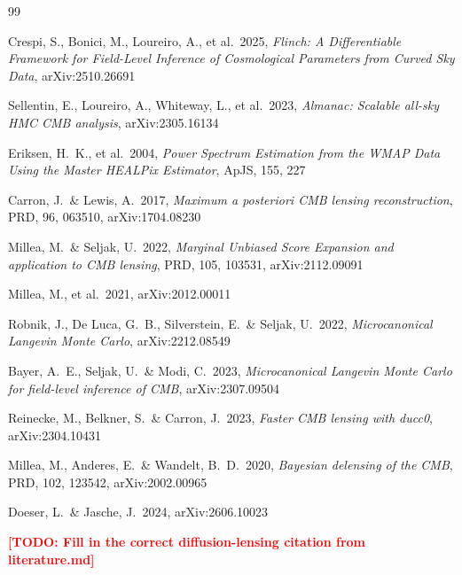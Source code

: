 \documentclass[twocolumn,superscriptaddress,aps,prl,floatfix]{revtex4-2}
\newcommand{\todo}[1]{\textcolor{red}{\textbf{[TODO: #1]}}}
\begin{document}
\begin{thebibliography}{99}

Crespi, S., Bonici, M., Loureiro, A., et al.\ 2025,
\textit{Flinch: A Differentiable Framework for Field-Level Inference of Cosmological Parameters from Curved Sky Data},
arXiv:2510.26691

Sellentin, E., Loureiro, A., Whiteway, L., et al.\ 2023,
\textit{Almanac: Scalable all-sky HMC CMB analysis},
arXiv:2305.16134

Eriksen, H.\ K., et al.\ 2004,
\textit{Power Spectrum Estimation from the WMAP Data Using the Master HEALPix Estimator},
ApJS, 155, 227

Carron, J.\ \& Lewis, A.\ 2017,
\textit{Maximum a posteriori CMB lensing reconstruction},
PRD, 96, 063510,
arXiv:1704.08230

Millea, M.\ \& Seljak, U.\ 2022,
\textit{Marginal Unbiased Score Expansion and application to CMB lensing},
PRD, 105, 103531,
arXiv:2112.09091

Millea, M., et al.\ 2021,
arXiv:2012.00011

Robnik, J., De Luca, G.\ B., Silverstein, E.\ \& Seljak, U.\ 2022,
\textit{Microcanonical Langevin Monte Carlo},
arXiv:2212.08549

Bayer, A.\ E., Seljak, U.\ \& Modi, C.\ 2023,
\textit{Microcanonical Langevin Monte Carlo for field-level inference of CMB},
arXiv:2307.09504

Reinecke, M., Belkner, S.\ \& Carron, J.\ 2023,
\textit{Faster CMB lensing with ducc0},
arXiv:2304.10431

Millea, M., Anderes, E.\ \& Wandelt, B.\ D.\ 2020,
\textit{Bayesian delensing of the CMB},
PRD, 102, 123542,
arXiv:2002.00965

Doeser, L.\ \& Jasche, J.\ 2024,
arXiv:2606.10023

\todo{Fill in the correct diffusion-lensing citation from literature.md}

\end{thebibliography}
\end{document}
